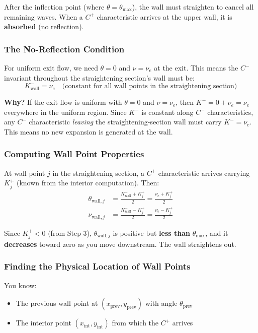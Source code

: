 \documentclass[11pt]{article}
\begin{document}
After the inflection point (where $\theta = \theta_{\max}$), the wall must straighten to cancel all remaining waves. When a $C^+$ characteristic arrives at the upper wall, it is \textbf{absorbed} (no reflection).

\subsubsection{The No-Reflection Condition}

For uniform exit flow, we need $\theta = 0$ and $\nu = \nu_e$ at the exit. This means the $C^-$ invariant throughout the straightening section's wall must be:
\begin{equation}
    \boxed{K^-_{\mathrm{wall}} = \nu_e \quad \text{(constant for all wall points in the straightening section)}}
\end{equation}

\textbf{Why?} If the exit flow is uniform with $\theta = 0$ and $\nu = \nu_e$, then $K^- = 0 + \nu_e = \nu_e$ everywhere in the uniform region. Since $K^-$ is constant along $C^-$ characteristics, any $C^-$ characteristic \emph{leaving} the straightening-section wall must carry $K^- = \nu_e$. This means no new expansion is generated at the wall.

\subsubsection{Computing Wall Point Properties}

At wall point $j$ in the straightening section, a $C^+$ characteristic arrives carrying $K^+_j$ (known from the interior computation). Then:
\begin{align}
    \theta_{\mathrm{wall},j} &= \frac{K^-_{\mathrm{wall}} + K^+_j}{2} = \frac{\nu_e + K^+_j}{2} \\[6pt]
    \nu_{\mathrm{wall},j} &= \frac{K^-_{\mathrm{wall}} - K^+_j}{2} = \frac{\nu_e - K^+_j}{2}
\end{align}

Since $K^+_j < 0$ (from Step 3), $\theta_{\mathrm{wall},j}$ is positive but \textbf{less than} $\theta_{\max}$, and it \textbf{decreases} toward zero as you move downstream. The wall straightens out.

\subsubsection{Finding the Physical Location of Wall Points}

You know:
\begin{itemize}
    \item The previous wall point at $(x_{\mathrm{prev}}, y_{\mathrm{prev}})$ with angle $\theta_{\mathrm{prev}}$
    \item The interior point $(x_{\mathrm{int}}, y_{\mathrm{int}})$ from which the $C^+$ arrives
\end{itemize}
\end{document}
